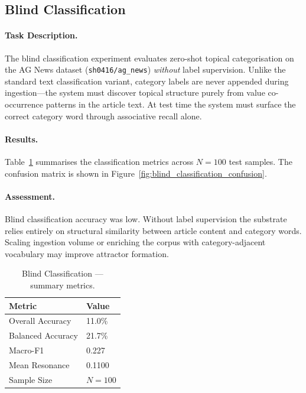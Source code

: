 \subsection{Blind Classification}
\label{sec:blind_classification}

\paragraph{Task Description.}
The blind classification experiment evaluates zero-shot topical categorisation
on the AG News dataset (\texttt{sh0416/ag\_news}) \emph{without} label
supervision.  Unlike the standard text classification variant, category
labels are never appended during ingestion---the system must discover
topical structure purely from value co-occurrence patterns in the article
text.  At test time the system must surface the correct category word
through associative recall alone.

\paragraph{Results.}
Table~\ref{tab:blind_classification_metrics} summarises the classification
metrics across $N = 100$ test samples.
The confusion matrix is shown in Figure~\ref{fig:blind_classification_confusion}.

\paragraph{Assessment.}
Blind classification accuracy was low.  Without label supervision the
substrate relies entirely on structural similarity between article content
and category words.  Scaling ingestion volume or enriching the corpus with
category-adjacent vocabulary may improve attractor formation.

\begin{table}[htbp]
  \centering
  \caption{Blind Classification --- summary metrics.}
  \label{tab:blind_classification_metrics}
  \begin{tabular}{ll}
    \toprule
    \textbf{Metric} & \textbf{Value} \\
    \midrule
    Overall Accuracy  & 11.0\% \\
    Balanced Accuracy & 21.7\% \\
    Macro-F1          & 0.227 \\
    Mean Resonance    & 0.1100 \\
    Sample Size       & $N = 100$ \\
    \bottomrule
  \end{tabular}
\end{table}
